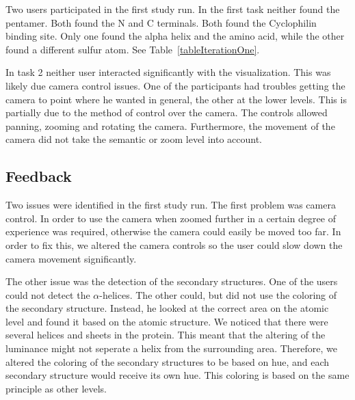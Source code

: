 \documentclass[review,journal]{vgtc}         %
\begin{document}
	
	Two users participated in the first study run. 
	In the first task neither found the pentamer. 
	Both found the N and C terminals. 
	Both found the Cyclophilin binding site. 
	Only one found the alpha helix and the amino acid, while the other found a different sulfur atom.
	See Table~\ref{tableIterationOne}.
	
	In task 2 neither user interacted significantly with the visualization. This was likely due camera control issues. 
	One of the participants had troubles getting the camera to point where he wanted in general, the other at the lower levels.
	This is partially due to the method of control over the camera. 
	The controls allowed panning, zooming and rotating the camera. 
	Furthermore, the movement of the camera did not take the semantic or zoom level into account.
	
	\subsection{Feedback}
	Two issues were identified in the first study run. 
	The first problem was camera control. 
	In order to use the camera when zoomed further in a certain degree of experience was required, otherwise the camera could easily be moved too far.
	In order to fix this, we altered the camera controls so the user could slow down the camera movement significantly.
	
	The other issue was the detection of the secondary structures. 
	One of the users could not detect the $\alpha$-helices. The other could, but did not use the coloring of the secondary structure.
	Instead, he looked at the correct area on the atomic level and found it based on the atomic structure.
	We noticed that there were several helices and sheets in the protein. 
	This meant that the altering of the luminance might not seperate a helix from the surrounding area. 
	Therefore, we altered the coloring of the secondary structures to be based on hue, and each secondary structure would receive its own hue.
	This coloring is based on the same principle as other levels.
	
	
\end{document}
